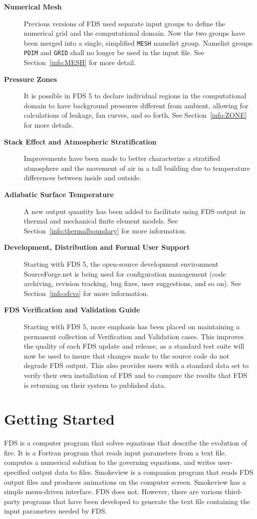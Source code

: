 \documentclass[11pt]{book}
\newcommand{\ct}{\tt\small}
\begin{document}
\begin{description}
\item[{\bf Numerical Mesh}] Previous versions of FDS used separate input groups
to define the numerical grid and the computational domain.  Now the two groups
have been merged into a single, simplified {\ct MESH} namelist group. Namelist groups {\ct PDIM} and
{\ct GRID} shall no longer be used in the input file.  See Section~\ref{info:MESH} for more detail.

\item[{\bf Pressure Zones}] It is possible in FDS 5 to declare individual
regions in the computational domain to have background pressures different from ambient,
allowing for calculations of leakage, fan curves, and so forth. See Section~\ref{info:ZONE} for more details.

\item[{\bf Stack Effect and Atmospheric Stratification}] Improvements have been made to
better characterize a stratified atmosphere and the movement of air in a tall building due
to temperature differences between inside and outside.

\item[{\bf Adiabatic Surface Temperature}] A new output quantity has been added to
facilitate using FDS output in thermal and mechanical finite element models.
See Section~\ref{info:thermalboundary} for more information.

\item[{\bf Development, Distribution and Formal User Support}] Starting with FDS 5, the open-source
development environment SourceForge.net is being used for configuration management
(code archiving, revision tracking, bug fixes, user suggestions, and so on).
See Section~\ref{info:sfcvs} for more information.

\item[{\bf FDS Verification and Validation Guide}] Starting with FDS 5, more emphasis has been placed on maintaining
a permanent collection of Verification and Validation cases.  This improves the
quality of each FDS update and release, as a standard test suite will now be used to insure that changes
made to the source code do not degrade FDS output.  This also provides users with a standard
data set to verify their own installation of FDS and to compare the results that FDS is returning
on their system to published data.
\end{description}


\chapter{Getting Started}
\label{info:gettingstarted}
FDS is a computer program that solves equations that describe the evolution of fire.
It is a Fortran program that reads input parameters from a text file, computes
a numerical solution to the governing equations, and writes user-specified output data to files.
Smokeview is a companion program that reads FDS output files and produces animations on the computer screen.
Smokeview has a simple menu-driven interface. FDS does not. However, there are various third-party programs
that have been developed to generate the text file containing the input parameters needed by FDS.
\end{document}
